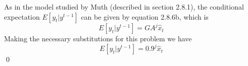\documentclass{homework}
\begin{document}
\begin{homeworkProblem}[Problem 2.24]
{\begin{enumerate}[a.]
      As in the model studied by Muth (described in section 2.8.1), the conditional expectation $E[y_t |y^{t-1}]$ can be given by equation 2.8.6b, which is
      $$ E[y_t |y^{t-1}] = G A^j \hat{x}_t$$
      Making the necessary substitutions for this problem we have
      $$E[y_t |y^{t-1}] =0.9^j \hat{x}_t $$
      \qed
    \end{enumerate}

  }
\end{homeworkProblem}
\end{document}

